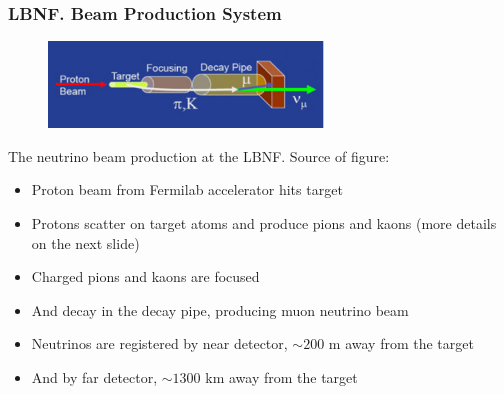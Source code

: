 \begin{frame}\frametitle{LBNF. Beam Production System}
\scriptsize
\begin{figure}
\label{fig:LBNF_nuBeam}
\centering
\includegraphics[width=0.65\textwidth, keepaspectratio=true]{figs/LBNF_nuBeam.png}  
\end{figure}
The neutrino beam production at the LBNF. Source of figure: \cite{ref_LBNFweb}\\
\begin{itemize}
  \item Proton beam from Fermilab accelerator hits target
  \item Protons scatter on target atoms and produce pions and kaons {\tiny (more details on the next slide)}
  \item Charged pions and kaons are focused
  \item And decay in the decay pipe, producing muon neutrino beam
  \item Neutrinos are registered by near detector, $\sim 200$ m away from the target
  \item And by far detector, $\sim 1300$ km away from the target
\end{itemize}
\end{frame}

